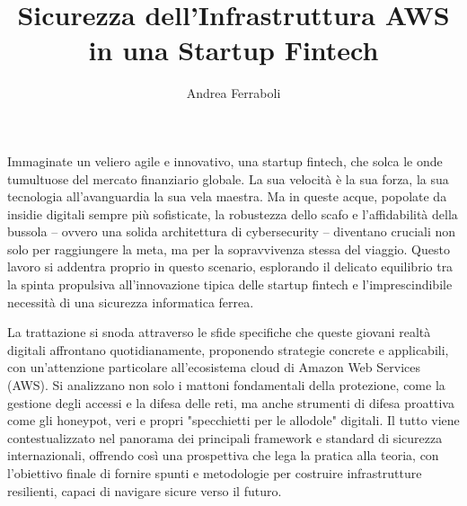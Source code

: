 \documentclass[a4paper,12pt]{report}
\begin{document}
\title{Sicurezza dell'Infrastruttura AWS in una Startup Fintech}
\author{Andrea Ferraboli}

\maketitlepage
{}
        Immaginate un veliero agile e innovativo, una startup fintech, che solca le onde tumultuose del mercato finanziario globale. La sua velocità è la sua forza, la sua tecnologia all'avanguardia la sua vela maestra. Ma in queste acque, popolate da insidie digitali sempre più sofisticate, la robustezza dello scafo e l'affidabilità della bussola – ovvero una solida architettura di cybersecurity – diventano cruciali non solo per raggiungere la meta, ma per la sopravvivenza stessa del viaggio. Questo lavoro si addentra proprio in questo scenario, esplorando il delicato equilibrio tra la spinta propulsiva all'innovazione tipica delle startup fintech e l'imprescindibile necessità di una sicurezza informatica ferrea.

        La trattazione si snoda attraverso le sfide specifiche che queste giovani realtà digitali affrontano quotidianamente, proponendo strategie concrete e applicabili, con un'attenzione particolare all'ecosistema cloud di Amazon Web Services (AWS). Si analizzano non solo i mattoni fondamentali della protezione, come la gestione degli accessi e la difesa delle reti, ma anche strumenti di difesa proattiva come gli honeypot, veri e propri "specchietti per le allodole" digitali. Il tutto viene contestualizzato nel panorama dei principali framework e standard di sicurezza internazionali, offrendo così una prospettiva che lega la pratica alla teoria, con l'obiettivo finale di fornire spunti e metodologie per costruire infrastrutture resilienti, capaci di navigare sicure verso il futuro.
\end{document}

